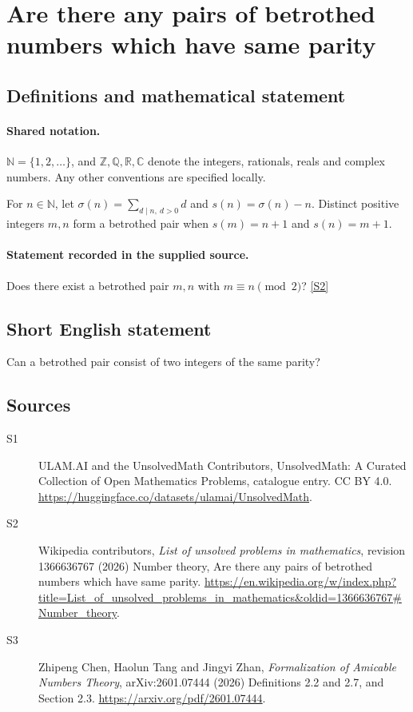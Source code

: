 \documentclass[11pt]{article}
\newcommand{\sref}[2]{\hyperlink{source:#1:#2}{[S#2]}}
\begin{document}
\section{Are there any pairs of betrothed numbers which have same parity}\label{statement}

\subsection{Definitions and mathematical statement}

\paragraph{Shared notation.}$\mathbb N=\{1,2,\ldots\}$, and $\mathbb Z,\mathbb Q,\mathbb R,\mathbb C$ denote the integers, rationals, reals and complex numbers. Any other conventions are specified locally.


For $n\in\mathbb N$, let $\sigma(n)=\sum_{d\mid n,\ d>0}d$ and $s(n)=\sigma(n)-n$. Distinct positive integers $m,n$ form a betrothed pair when $s(m)=n+1$ and $s(n)=m+1$.
\paragraph{Statement recorded in the supplied source.}
Does there exist a betrothed pair $m,n$ with $m\equiv n\pmod2$? \sref{statement}{2}
\subsection{Short English statement}
Can a betrothed pair consist of two integers of the same parity?
\subsection{Sources}
\begin{description}
\item[\hypertarget{source:statement:1}{S1}] ULAM.AI and the UnsolvedMath Contributors, UnsolvedMath: A Curated Collection of Open Mathematics Problems, catalogue entry. CC BY 4.0. \url{https://huggingface.co/datasets/ulamai/UnsolvedMath}.
\item[\hypertarget{source:statement:2}{S2}] Wikipedia contributors, \emph{List of unsolved problems in mathematics}, revision 1366636767 (2026) Number theory, Are there any pairs of betrothed numbers which have same parity. \url{https://en.wikipedia.org/w/index.php?title=List_of_unsolved_problems_in_mathematics&oldid=1366636767#Number_theory}.
\item[\hypertarget{source:statement:3}{S3}] Zhipeng Chen, Haolun Tang and Jingyi Zhan, \emph{Formalization of Amicable Numbers Theory}, arXiv:2601.07444 (2026) Definitions 2.2 and 2.7, and Section 2.3. \url{https://arxiv.org/pdf/2601.07444}.
\end{description}
\label{end:statement}
\end{document}
